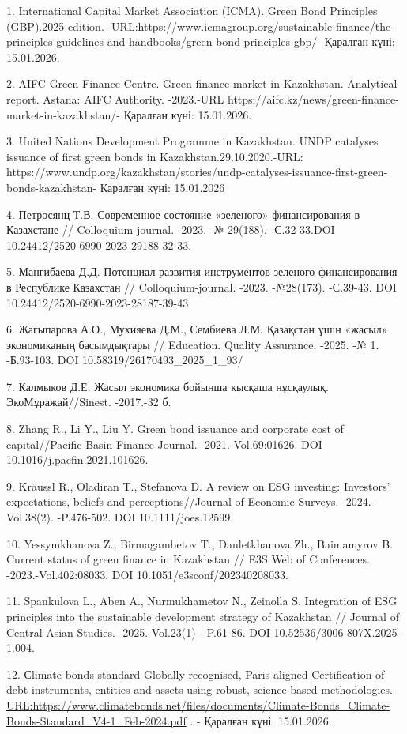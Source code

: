 \begin{refs}
1. International Capital Market Association (ICMA). Green Bond
Principles (GBP).2025 edition.
-URL:https://www.icmagroup.org/sustainable-finance/the-principles-guidelines-and-handbooks/green-bond-principles-gbp/-
Қаралған күні: 15.01.2026.

2. AIFC Green Finance Centre. Green finance market in Kazakhstan.
Analytical report. Astana: AIFC Authority. -2023.-URL
https://aifc.kz/news/green-finance-market-in-kazakhstan/- Қаралған күні:
15.01.2026.

3. United Nations Development Programme in Kazakhstan. UNDP catalyses
issuance of first green bonds in Kazakhstan.29.10.2020.-URL:
https://www.undp.org/kazakhstan/stories/undp-catalyses-issuance-first-green-bonds-kazakhstan-
Қаралған күні: 15.01.2026

4. Петросянц Т.В. Современное состояние «зеленого» финансирования в
Казахстане // Colloquium-journal. -2023. -№ 29(188). -С.32-33.DOI
10.24412/2520-6990-2023-29188-32-33.

5. Мангибаева Д.Д. Потенциал развития инструментов зеленого
финансирования в Республике Казахстан // Colloquium-journal. -2023.
-№28(173). -С.39-43. DOI 10.24412/2520-6990-2023-28187-39-43

6. Жагыпарова А.О., Мухияева Д.М., Сембиева Л.М. Қазақстан үшін «жасыл»
экономиканың басымдықтары // Education. Quality Assurance. -2025. -№ 1.
-Б.93-103. DOI 10.58319/26170493\_2025\_1\_93/

7. Калмыков Д.Е. Жасыл экономика бойынша қысқаша нұсқаулық.
ЭкоМұражай//Sinest. -2017.-32 б.

8. Zhang R., Li Y., Liu Y. Green bond issuance and corporate cost of
capital//Pacific-Basin Finance Journal. -2021.-Vol.69:01626. DOI
10.1016/j.pacfin.2021.101626.

9. Kräussl R., Oladiran T., Stefanova D. A review on ESG investing:
Investors' expectations, beliefs and perceptions//Journal of Economic
Surveys. -2024.-Vol.38(2). -P.476-502. DOI 10.1111/joes.12599.

10. Yessymkhanova Z., Birmagambetov T., Dauletkhanova Zh., Baimamyrov B.
Current status of green finance in Kazakhstan // E3S Web of Conferences.
-2023.-Vol.402:08033. DOI 10.1051/e3sconf/202340208033.

11. Spankulova L., Aben A., Nurmukhametov N., Zeinolla S. Integration of
ESG principles into the sustainable development strategy of Kazakhstan
// Journal of Central Asian Studies. -2025.-Vol.23(1) - P.61-86. DOI
10.52536/3006-807X.2025-1.004.

12. Сlimate bonds standard Globally recognised, Paris-aligned
Certification of debt instruments, entities and assets using robust,
science-based methodologies.-
\url{URL:https://www.climatebonds.net/files/documents/Climate-Bonds_Climate-Bonds-Standard_V4-1_Feb-2024.pdf}
. - Қаралған күні: 15.01.2026.
\end{refs}

